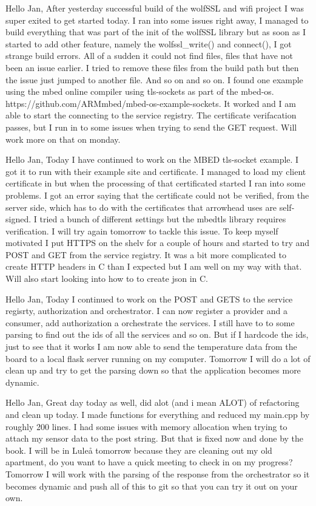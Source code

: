 Hello Jan,
After yesterday successful build of the wolfSSL and wifi project I was super exited to get started today. 
I ran into some issues right away, I managed to build everything that was part of the init of the wolfSSL library but as 
soon as I started to add other feature, namely the wolfssl_write() and connect(), I got strange build errors. All of a sudden 
it could not find files, files that have not been an issue earlier. I tried to remove these files from the build path but then the 
issue just jumped to another file. And so on and so on. I found one example using the mbed online compiler using tls-sockets as part of the 
mbed-os. https://github.com/ARMmbed/mbed-os-example-sockets. It worked and I am able to start the connecting to the service registry. The 
certificate verifacation passes, but I run in to some issues when trying to send the GET request. Will work more on that on monday.

Hello Jan,
Today I have continued to work on the MBED  tls-socket example. I got it to run with their example site and certificate. I managed to 
load my client certificate in but when the processing of that certificated started I ran into some problems. I got an error saying 
that the certificate could not be verified, from the server side, which has to do with the certificates that arrowhead uses are self-signed.
I tried a bunch of different settings but the mbedtls library requires verification. I will try again tomorrow to tackle this issue. To keep 
myself motivated I put HTTPS on the shelv for a couple of hours and started to try and POST and GET from the service registry. It was a bit 
more complicated to create HTTP headers in C than I expected but I am well on my way with that. Will also start looking into how to to create json in C. 

Hello Jan,
Today I continued to work on the POST and GETS to the service regisrty, authorization and orchestrator. 
I can now register a provider and a consumer, add authorization a orchestrate the services. I still have to to 
some parsing to find out the ids of all the services and so on. But if I hardcode the ids, just to see that it 
works I am now able to send the temperature data from the board to a local flask server running on my computer. 
Tomorrow I will do a lot of clean up and try to get the parsing down so that the application becomes more dynamic.

Hello Jan,
Great day today as well, did alot (and i mean ALOT) of refactoring and clean up today. I made functions for everything and reduced my main.cpp by roughly 200 lines. 
I had some issues with memory allocation when trying to attach my sensor data to the post string. But that is fixed now and done by the book. I will be in Luleå tomorrow
because they are cleaning out my old apartment, do you want to have a quick meeting to check in on my progress?
Tomorrow I will work with the parsing of the response from the orchestrator so it becomes dynamic and push all of this to git so that you can try it out on your own.


